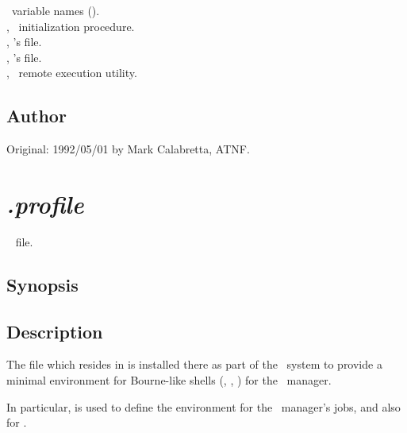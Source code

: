 \aipspp\ variable names ().\\
, \aipspp\ initialization procedure.\\
, 's  file.\\
, 's  file.\\
, \aipspp\ remote execution utility.

\subsection*{Author}

Original: 1992/05/01 by Mark Calabretta, ATNF.


\newpage
\section{\textit{.profile}}
\label{.profile}

\aipspp\  file.

\subsection*{Synopsis}

\begin{synopsis}
\end{synopsis}

\subsection*{Description}

The  file which resides in  is installed there
as part of the \aipspp\ system to provide a minimal environment for
Bourne-like shells (, , ) for the
\aipspp\ manager.

In particular,  is used to define the environment for the
\aipspp\ manager's  jobs, and also for
.

